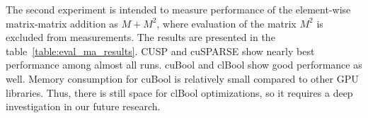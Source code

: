 The second experiment is intended to measure performance of the element-wise matrix-matrix addition as $M + M^2$, where evaluation of the matrix $M^2$ is excluded from measurements.
The results are presented in the table~\ref{table:eval_ma_results}.
CUSP and cuSPARSE show nearly best performance among almost all runs.
cuBool and clBool show good performance as well. 
Memory consumption for cuBool is relatively small compared to other GPU libraries.
Thus, there is still space for clBool optimizations, so it requires a deep investigation in our future research.




